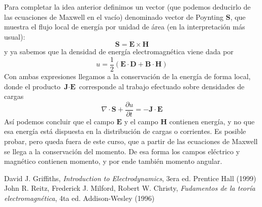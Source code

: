 \documentclass[11pt,a4paper]{article}
\numberwithin{equation}{section}
\begin{document}
Para completar la idea anterior definimos un vector (que podemos deducirlo de las ecuaciones de Maxwell en el vacío) denominado vector de Poynting $\textbf{S}$, que muestra el flujo local de energía por unidad de área (en la interpretación más usual):
\begin{equation}
    \textbf{S} = \textbf{E} \times \textbf{H}
    \label{eq:em_poyting}
\end{equation}
y ya sabemos que la densidad de energía electromagnética viene dada por
\begin{equation}
    u = \frac{1}{2} (\textbf{E} \cdot \textbf{D} + \textbf{B} \cdot \textbf{H})
    \label{eq:em_densidad_energia}
\end{equation}
Con ambas expresiones llegamos a la conservación de la energía de forma local, donde el producto $\textbf{J} \cdot \textbf{E}$ corresponde al trabajo efectuado sobre densidades de cargas
\begin{equation}
    \nabla \cdot \textbf{S} + \frac{\partial u}{\partial t} = -\textbf{J} \cdot \textbf{E}
    \label{eq:em_ec_continuidad}
\end{equation}
Así podemos concluir que el campo $\textbf{E}$ y el campo $\textbf{H}$ contienen energía, y no que esa energía está dispuesta en la distribución de cargas o corrientes. Es posible probar, pero queda fuera de este curso, que a partir de las ecuaciones de Maxwell se llega a la conservación del momento. De esa forma los campos eléctrico y magnético contienen momento, y por ende también momento angular.
\begin{thebibliography}{9}
        David J. Griffiths, 
        \emph{Introduction to Electrodynamics},
        3era ed.
        Prentice Hall
        (1999)
        John R. Reitz, Frederick J. Milford, Robert W. Christy,
        \emph{Fudamentos de la teoría electromagnética},
        4ta ed.
        Addison-Wesley
        (1996)
\end{thebibliography}
\end{document}
